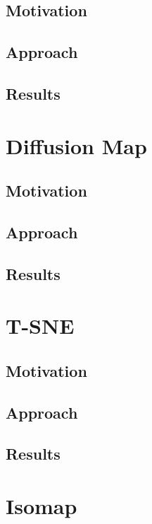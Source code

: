 \documentclass[12pt]{article}
\begin{document}
\subsection{Motivation}

\subsection{Approach}

\subsection{Results}

\section{Diffusion Map} \label{sec: Diffusion Map}

\subsection{Motivation}

\subsection{Approach}

\subsection{Results}

\section{T-SNE} \label{sec: T-SNE}
\subsection{Motivation}

\subsection{Approach}

\subsection{Results}

\section{Isomap} \label{sec: Isomap}
\end{document}
